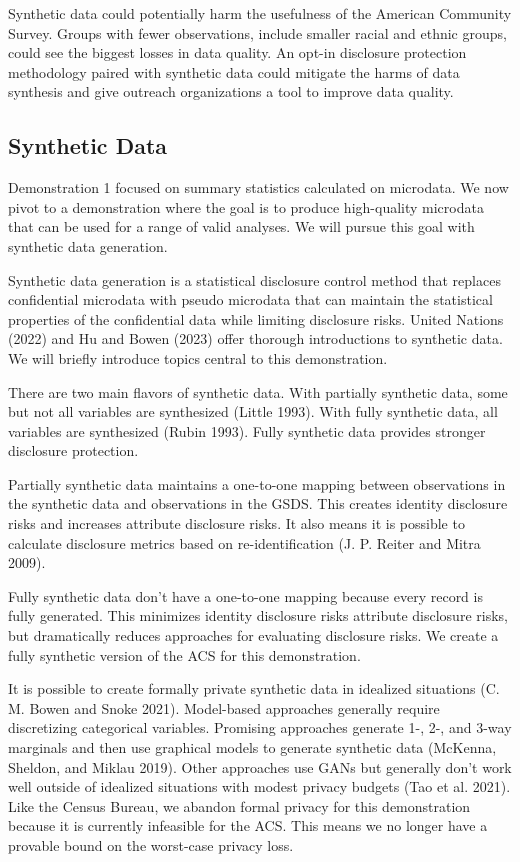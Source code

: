 \documentclass[
]{urban-formatting}
\begin{document}
Synthetic data could potentially harm the usefulness of the American
Community Survey. Groups with fewer observations, include smaller racial
and ethnic groups, could see the biggest losses in data quality. An
opt-in disclosure protection methodology paired with synthetic data
could mitigate the harms of data synthesis and give outreach
organizations a tool to improve data quality.

\subsection{Synthetic Data}

Demonstration 1 focused on summary statistics calculated on microdata.
We now pivot to a demonstration where the goal is to produce
high-quality microdata that can be used for a range of valid analyses.
We will pursue this goal with synthetic data generation.

Synthetic data generation is a statistical disclosure control method
that replaces confidential microdata with pseudo microdata that can
maintain the statistical properties of the confidential data while
limiting disclosure risks. United Nations (2022) and Hu and Bowen (2023)
offer thorough introductions to synthetic data. We will briefly
introduce topics central to this demonstration.

There are two main flavors of synthetic data. With partially synthetic
data, some but not all variables are synthesized (Little 1993). With
fully synthetic data, all variables are synthesized (Rubin 1993). Fully
synthetic data provides stronger disclosure protection.

Partially synthetic data maintains a one-to-one mapping between
observations in the synthetic data and observations in the GSDS. This
creates identity disclosure risks and increases attribute disclosure
risks. It also means it is possible to calculate disclosure metrics
based on re-identification (J. P. Reiter and Mitra 2009).

Fully synthetic data don't have a one-to-one mapping because every
record is fully generated. This minimizes identity disclosure risks
attribute disclosure risks, but dramatically reduces approaches for
evaluating disclosure risks. We create a fully synthetic version of the
ACS for this demonstration.

It is possible to create formally private synthetic data in idealized
situations (C. M. Bowen and Snoke 2021). Model-based approaches
generally require discretizing categorical variables. Promising
approaches generate 1-, 2-, and 3-way marginals and then use graphical
models to generate synthetic data (McKenna, Sheldon, and Miklau 2019).
Other approaches use GANs but generally don't work well outside of
idealized situations with modest privacy budgets (Tao et al. 2021). Like
the Census Bureau, we abandon formal privacy for this demonstration
because it is currently infeasible for the ACS. This means we no longer
have a provable bound on the worst-case privacy loss.
\end{document}
